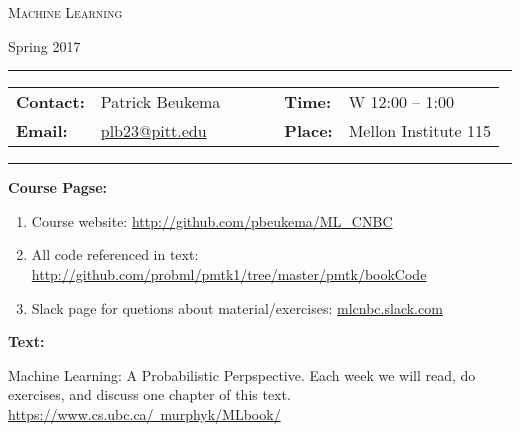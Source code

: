 \documentclass[11pt, a4paper]{article}
\begin{document}
\begin{center}
{\Large \textsc{Machine Learning}}
\end{center}
\begin{center}
Spring 2017
\end{center}

\begin{center}
\rule{6in}{0.4pt}
\begin{minipage}[t]{.75\textwidth}
\begin{tabular}{llcccll}
\textbf{Contact:} & Patrick Beukema & & &  & \textbf{Time:} & W 12:00 -- 1:00 \\
\textbf{Email:} &  \href{plb23@pitt.edu}{plb23@pitt.edu} & & & & \textbf{Place:} & Mellon Institute 115
\end{tabular}
\end{minipage}
\rule{6in}{0.4pt}
\end{center}
\vspace{.5cm}
\setlength{\unitlength}{1in}
\renewcommand{\arraystretch}{2}

\noindent\textbf{Course Pagse:}

\begin{enumerate}

\item Course website: \url{http://github.com/pbeukema/ML_CNBC}

\item All code referenced in text: \url{http://github.com/probml/pmtk1/tree/master/pmtk/bookCode}


\item Slack page for quetions about material/exercises: \url{mlcnbc.slack.com}

\end{enumerate}

\noindent\textbf{Text:} %

Machine Learning: A Probabilistic Perpspective. Each week we will read, do exercises, and discuss one chapter of this text. \href{https://www.cs.ubc.ca/~murphyk/MLbook/}{https://www.cs.ubc.ca/~murphyk/MLbook/}
\end{document}
